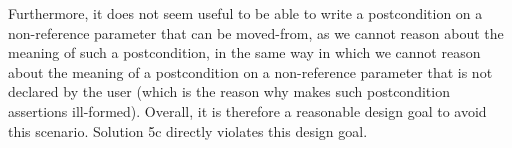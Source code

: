 Furthermore, it does not seem useful to be able to write a postcondition on a non-reference parameter that can be moved-from, as we cannot reason about the meaning of such a postcondition, in the same way in which we cannot reason about the meaning of a postcondition on a non-reference parameter that is not declared  by the user (which is the reason why \cite{P2900R8} makes such postcondition assertions ill-formed). Overall, it is therefore a reasonable design goal to avoid this scenario. Solution 5c directly violates this design goal.


%


